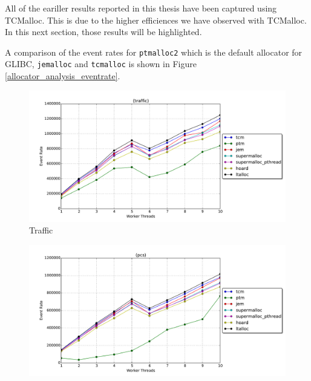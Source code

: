 \documentclass[11pt]{book}
\begin{document}
All of the eariller results reported in this thesis have been captured using TCMalloc.  This is due
to the higher efficiences we have observed with TCMalloc.  In this next section, those results will
be highlighted.

A comparison of the event rates for \texttt{ptmalloc2} which is the default allocator for GLIBC,
\texttt{jemalloc} and \texttt{tcmalloc} is shown in Figure \ref{allocator_analysis_eventrate}.

\begin{figure}
  \begin{minipage}{.5\textwidth}
    \begin{center}
      \includegraphics[width=\textwidth,keepaspectratio,quiet]{figs/memory_allocation/traffic_eventrate.pdf} \\
      Traffic \\
    \end{center}
  \end{minipage}%
  \hfill
  \begin{minipage}{.5\textwidth}
    \begin{center}
      \includegraphics[width=\textwidth,keepaspectratio,quiet]{figs/memory_allocation/pcs_eventrate.pdf} \\

\end{center}
\end{minipage}
\end{figure}
\end{document}
